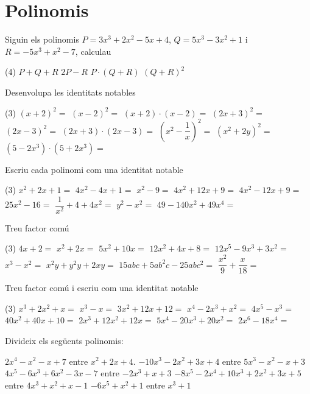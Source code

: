 \documentclass{article}
\let\frac\dfrac
\begin{document}
  \section{Polinomis}
  \begin{mylist}
  	
  	\item Siguin els polinomis $P=3x^3+2x^2-5x+4$, $Q=5x^3-3x^2+1$ i $R=-5x^3+x^2-7$, calculau
  	\begin{tasks}(4)
  		\task $P+Q+R$
  		\task $2P-R$
  		\task $P\cdot (Q+R)$
  		\task $(Q+R)^2$
  	\end{tasks}
  	
  	\item Desenvolupa les identitats notables
  \begin{tasks}(3)
  	\task $(x+2)^2=$
  	\task $(x-2)^2=$
  	\task $(x+2)\cdot(x-2)=$
  	\task $(2x+3)^2=$
  	\task $(2x-3)^2=$
  	\task $(2x+3)\cdot (2x-3)=$
  	\task $\left(x^2-\frac{1}{x}\right)^2=$
  	\task $(x^2+2y)^2=$
  	\task $(5-2x^3)\cdot(5+2x^3)=$ 	
  \end{tasks}
  	
  	\item Escriu cada polinomi com una identitat notable
  	  \begin{tasks}(3)
  		\task $x^2+2x+1=$
  		\task $4x^2-4x+1=$
  		\task $x^2-9=$
  		\task $4x^2+ 12x +9=$
  		\task $4x^2-12x+9=$
  		\task $25x^2-16=$
  		\task $\frac{1}{x^2}+4 + 4x^2=$
  		\task $y^2-x^2=$
  		\task $49 - 140x^2 + 49x^4 =$ 	
  	\end{tasks}
  	
  	\item Treu factor comú
  	  \begin{tasks}(3)
  		\task $4x+2=$
  		\task $x^2+2x=$
  		\task $5x^2+10x=$
  		\task $12x^2+4x+8=$
  		\task $12x^5-9x^3+3x^2=$
  		\task $x^3-x^2=$
  		\task $x^2 y + y^2 y + 2 xy =$
  		\task $15abc + 5ab^2c - 25 abc^2=$
  		\task $\frac{x^2}{9}+ \frac{x}{18} =$ 	
  	\end{tasks}
  	
  	\item Treu factor comú i escriu com una identitat notable
  	\begin{tasks}(3)
  		\task $x^3+2x^2+x=$
  		\task $x^3-x=$
  		\task $3x^2+12x+12=$
  		\task $x^4-2x^3+x^2=$
  		\task $4x^5-x^3=$
  		\task $40x^2+40x+10=$
  		\task $2x^3+12x^2+12x=$
  		\task $5x^4-20x^3+20x^2=$
  		\task $2x^6-18x^4=$ 	
  	\end{tasks}
  	
  	
  	\item  Divideix els següents polinomis:   
  	\begin{tasks}
  		\task $2x^{4} -x^{2} -x+7$ entre $x^{2} +2x+4$.    
  		\task $-10x^{3} -2x^{2} +3x+4$ entre $5x^{3} -x^{2} -x+3$
  		\task $4x^{5} -6x^{3} +6x^{2} -3x-7$ entre $-2x^{3} +x+3$   
  		\task $-8x^{5} -2x^{4} +10x^{3} +2x^{2} +3x+5$ entre $4x^{3} +x^{2} +x-1$ 
  		\task $-6x^{5} +x^{2} +1$ entre $x^{3} +1$ 
  	\end{tasks}
  	

\end{mylist}
\end{document}
